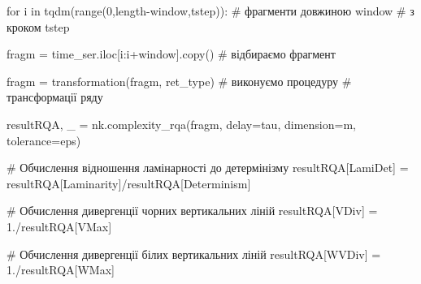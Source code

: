 \documentclass[
  letterpaper,
]{report}
\newenvironment{Shaded}{\begin{snugshade}}{\end{snugshade}}
\newcommand{\BuiltInTok}[1]{\textcolor[rgb]{0.00,0.23,0.31}{#1}}
\newcommand{\CommentTok}[1]{\textcolor[rgb]{0.37,0.37,0.37}{#1}}
\newcommand{\ControlFlowTok}[1]{\textcolor[rgb]{0.00,0.23,0.31}{#1}}
\newcommand{\DecValTok}[1]{\textcolor[rgb]{0.68,0.00,0.00}{#1}}
\newcommand{\FloatTok}[1]{\textcolor[rgb]{0.68,0.00,0.00}{#1}}
\newcommand{\KeywordTok}[1]{\textcolor[rgb]{0.00,0.23,0.31}{#1}}
\newcommand{\NormalTok}[1]{\textcolor[rgb]{0.00,0.23,0.31}{#1}}
\newcommand{\OperatorTok}[1]{\textcolor[rgb]{0.37,0.37,0.37}{#1}}
\newcommand{\StringTok}[1]{\textcolor[rgb]{0.13,0.47,0.30}{#1}}
\begin{document}
\begin{Shaded}
\begin{Highlighting}[]
\ControlFlowTok{for}\NormalTok{ i }\KeywordTok{in}\NormalTok{ tqdm(}\BuiltInTok{range}\NormalTok{(}\DecValTok{0}\NormalTok{,length}\OperatorTok{{-}}\NormalTok{window,tstep)):  }\CommentTok{\# фрагменти довжиною window  }
                                              \CommentTok{\# з кроком tstep}

\NormalTok{    fragm }\OperatorTok{=}\NormalTok{ time\_ser.iloc[i:i}\OperatorTok{+}\NormalTok{window].copy()  }\CommentTok{\# відбираємо фрагмент}

\NormalTok{    fragm }\OperatorTok{=}\NormalTok{ transformation(fragm, ret\_type)   }\CommentTok{\# виконуємо процедуру }
                                              \CommentTok{\# трансформації ряду}
    
\NormalTok{    resultRQA, \_ }\OperatorTok{=}\NormalTok{ nk.complexity\_rqa(fragm,}
\NormalTok{                                     delay}\OperatorTok{=}\NormalTok{tau,}
\NormalTok{                                     dimension}\OperatorTok{=}\NormalTok{m,}
\NormalTok{                                     tolerance}\OperatorTok{=}\NormalTok{eps)}
    
    \CommentTok{\# Обчислення відношення ламінарності до детермінізму}
\NormalTok{    resultRQA[}\StringTok{\textquotesingle{}LamiDet\textquotesingle{}}\NormalTok{] }\OperatorTok{=}\NormalTok{ resultRQA[}\StringTok{\textquotesingle{}Laminarity\textquotesingle{}}\NormalTok{]}\OperatorTok{/}\NormalTok{resultRQA[}\StringTok{\textquotesingle{}Determinism\textquotesingle{}}\NormalTok{]}

    \CommentTok{\# Обчислення дивергенції чорних вертикальних ліній}
\NormalTok{    resultRQA[}\StringTok{\textquotesingle{}VDiv\textquotesingle{}}\NormalTok{] }\OperatorTok{=} \FloatTok{1.}\OperatorTok{/}\NormalTok{resultRQA[}\StringTok{\textquotesingle{}VMax\textquotesingle{}}\NormalTok{]}

    \CommentTok{\# Обчислення дивергенції білих вертикальних ліній}
\NormalTok{    resultRQA[}\StringTok{\textquotesingle{}WVDiv\textquotesingle{}}\NormalTok{] }\OperatorTok{=} \FloatTok{1.}\OperatorTok{/}\NormalTok{resultRQA[}\StringTok{\textquotesingle{}WMax\textquotesingle{}}\NormalTok{]}


\end{Highlighting}
\end{Shaded}
\end{document}
